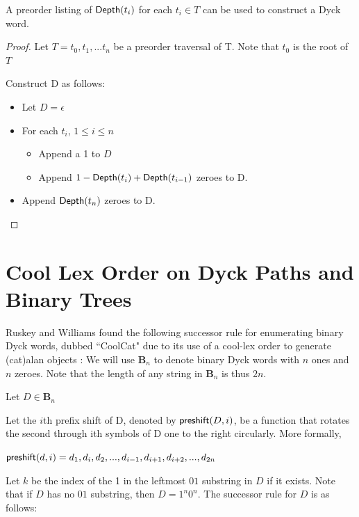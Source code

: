 \begin{remark}A preorder listing of $\mathsf{Depth}{(t_i)} $ for each $ t_i \in T$ can be used to construct a Dyck word. \label{re:construct_dyck}

\end{remark} 
\begin{proof}

    Let $T=t_0,t_1,...t_n$ be a preorder traversal of T.  Note that $t_0$ is the root of $T$

    Construct D as follows: 

    \begin{itemize}
	\item Let $D=\epsilon$ %
	\item For each $t_i$, $1\le i \le n$
	    \begin{itemize}
		\item Append a 1 to $D$
		\item Append $1-\mathsf{Depth}{(t_{i})}+\mathsf{Depth}{(t_{i-1})}$ zeroes to D.
	    \end{itemize}
	\item Append $\mathsf{Depth}{(t_{n})}$ zeroes to D. 
    \end{itemize}
\end{proof} 

\section{Cool Lex Order on Dyck Paths and Binary Trees}
Ruskey and Williams found the following successor rule for enumerating binary Dyck words, dubbed ``CoolCat" due to its use of a cool-lex order to generate (cat)alan objects \cite{ruskey2008generating}:
We will use $\mathbf{B}_n$ to denote binary Dyck words with $n$ ones and $n$ zeroes.  Note that the length of any string in $\mathbf{B}_n$ is thus $2n$.

\noindent Let $D \in \mathbf{B}_n$

\noindent Let the $i$th prefix shift of D, denoted by $\mathsf{preshift(} D, i \mathsf{)}$, be a function that rotates the second through ith symbols of D one to the right circularly.  More formally, 

\noindent $\mathsf{preshift(} d, i \mathsf{)}=d_1,d_i,d_2,...,d_{i-1},d_{i+1},d_{i+2},...,d_{2n}$


\noindent Let $k$ be the index of the 1 in the leftmost $01$ substring in $D$ if it exists. Note that if $D$ has no $01$ substring, then $D=1^n0^n$.  The successor rule for $D$ is as follows:


